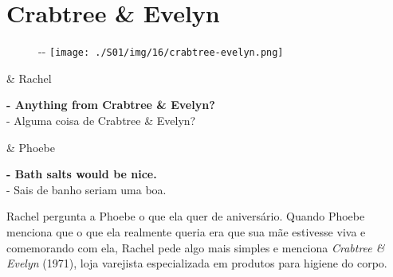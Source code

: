 \hypertarget{crabtree-evelyn}{%
\section{Crabtree \& Evelyn}\label{crabtree-evelyn}}

\begin{figure}[!ht]
  \begin{adjustwidth}{-\oddsidemargin-1in}{-\rightmargin}
    \centering
    \texttt{[image: ./S01/img/16/crabtree-evelyn.png]}
  \end{adjustwidth}
\end{figure}

\begin{tcolorbox}[enhanced,center upper,
    drop fuzzy shadow southeast, boxrule=0.3pt,
    lower separated=false, breakable,
    colframe=black!30!dialogoBorder,colback=white]
\begin{minipage}[c]{0.16\linewidth}
   & \centering \scriptsize{Rachel}
\end{minipage}
\hfill
\begin{minipage}[c]{0.8\linewidth}
  \textbf{- Anything from Crabtree \& Evelyn?}\\
  - Alguma coisa de Crabtree \& Evelyn?
\end{minipage}

\medskip
\begin{minipage}[c]{0.16\linewidth}
   & \centering \scriptsize{Phoebe}
\end{minipage}
\hfill
\begin{minipage}[c]{0.8\linewidth}
  \textbf{- Bath salts would be nice.}\\
  - Sais de banho seriam uma boa.
\end{minipage}
\end{tcolorbox}

Rachel pergunta a Phoebe o que ela quer de aniversário. Quando Phoebe
menciona que o que ela realmente queria era que sua mãe estivesse viva e
comemorando com ela, Rachel pede algo mais simples e menciona
\emph{Crabtree \& Evelyn} (1971), loja varejista especializada em
produtos para higiene do corpo.

